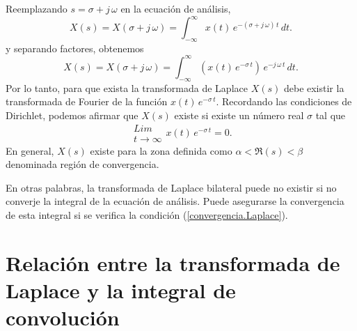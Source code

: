 Reemplazando $s = \sigma + j \, \omega$ en la ecuaci\'{o}n de
an\'{a}lisis,
\begin{equation}
  X\left( s \right) =
  X\left( \sigma + j \, \omega \right) =
      \int_{-\infty }^{\infty }x\left( t\right) \, e^{-(\sigma + j \,
        \omega) \, t} \, dt.
\end{equation}
y separando factores, obtenemos
\begin{equation}
  X\left( s \right) =
  X\left( \sigma + j \, \omega \right) =
      \int_{-\infty }^{\infty } \left(x\left( t\right) \, e^{-\sigma \,
          t} \right) \, e^{-j \, \omega \, t} \, dt.
\end{equation}
Por lo tanto, para que exista la transformada de Laplace $X(s)$ debe
existir la transformada de Fourier de la funci\'{o}n $x(t) \,
e^{-\sigma \, t}$. 
Recordando las condiciones de Dirichlet, podemos afirmar que 
$X(s)$ existe si existe un n\'{u}mero real $\sigma$ tal que 
\begin{equation}
\begin{array}{c}
Lim\\
t \rightarrow \infty
\end{array}
x(t) \, e^{-\sigma \, t} = 0. \label{convergencia.Laplace}
\end{equation}
En general, $X(s)$ existe para la zona definida como
$\alpha < \Re(s) < \beta$ denominada regi\'{o}n de convergencia. 

En otras palabras, la transformada de Laplace bilateral puede no existir si no converje
la integral de la ecuaci\'{o}n de an\'{a}lisis. Puede asegurarse la convergencia de esta integral
si se verifica la condici\'{o}n (\ref{convergencia.Laplace}).

\section{Relaci\'{o}n entre la transformada de Laplace y la integral de convoluci\'{o}n}

